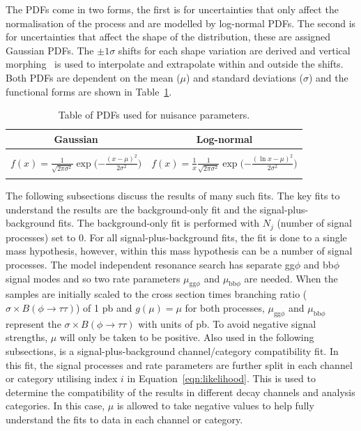 The \ac{PDF}s come in two forms, the first is for uncertainties that only affect the normalisation of the process and are modelled by log-normal \ac{PDF}s. 
The second is for uncertainties that affect the shape of the distribution, these are assigned Gaussian \ac{PDF}s.
The $\pm1\sigma$ shifts for each shape variation are derived and vertical morphing~\cite{Conway:2011in} is used to interpolate and extrapolate within and outside the shifts.
Both \ac{PDF}s are dependent on the mean ($\mu$) and standard deviations ($\sigma$) and the functional forms are shown in Table~\ref{tab:pdfs}. \\

\begin{table}[!hbtp]
    \centering
    \begin{tabular}{|c|c|}
         \hline
         Gaussian & Log-normal  \\
         \hline
         \hline
          & \\
         $f(x) = \frac{1}{\sqrt{2\pi\sigma^{2}}} \exp\Big({-\frac{(x - \mu)^2}{2\sigma^2}}\Big)$ & $f(x) = \frac{1}{x} \frac{1}{\sqrt{2\pi\sigma^{2}}} \exp\Big({-\frac{(\ln x - \mu)^2}{2\sigma^2}}\Big)$ \\
          & \\
         \hline
    \end{tabular}
    \caption{Table of PDFs used for nuisance parameters.}
    \label{tab:pdfs}
\end{table}

The following subsections discuss the results of many such fits.
The key fits to understand the results are the background-only fit and the signal-plus-background fits.
The background-only fit is performed with $N_j$ (number of signal processes) set to 0.
For all signal-plus-background fits, the fit is done to a single mass hypothesis, however, within this mass hypothesis can be a number of signal processes.
The model independent resonance search has separate gg$\phi$ and bb$\phi$ signal modes and so two rate parameters $\mu_{\text{gg}\phi}$ and $\mu_{\text{bb}\phi}$ are needed.
When the samples are initially scaled to the cross section times branching ratio ($\sigma \times B (\phi\rightarrow\tau\tau)$) of 1 pb and $g(\mu)=\mu$ for both processes, $\mu_{\text{gg}\phi}$ and $\mu_{\text{bb}\phi}$ represent the $\sigma \times B (\phi\rightarrow\tau\tau)$ with units of pb.
To avoid negative signal strengths, $\mu$ will only be taken to be positive.
Also used in the following subsections, is a signal-plus-background channel/category compatibility fit.
In this fit, the signal processes and rate parameters are further split in each channel or category utilising index $i$ in Equation~\ref{eqn:likelihood}.
This is used to determine the compatibility of the results in different decay channels and analysis categories.
In this case, $\mu$ is allowed to take negative values to help fully understand the fits to data in each channel or category. \\

